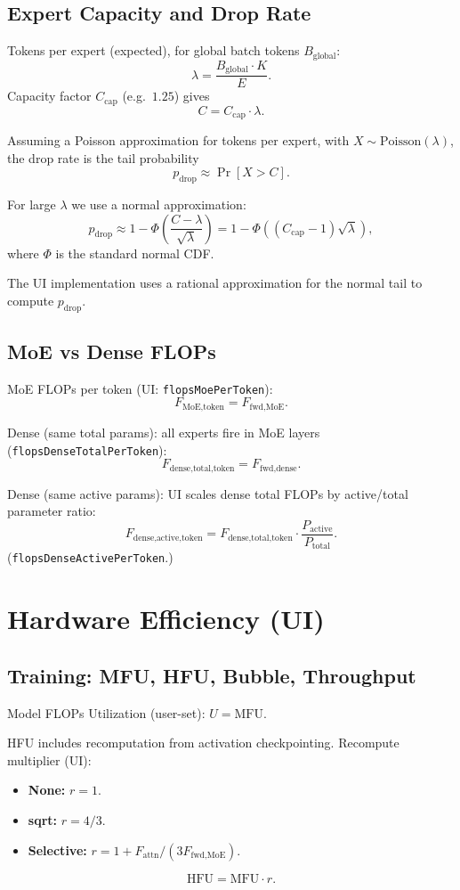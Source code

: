 \documentclass[11pt]{article}
\begin{document}
\subsection{Expert Capacity and Drop Rate}

Tokens per expert (expected), for global batch tokens $B_{\text{global}}$:
\[
\lambda = \frac{B_{\text{global}} \cdot K}{E}.
\]
Capacity factor $C_{\text{cap}}$ (e.g.\ $1.25$) gives
\[
C = C_{\text{cap}} \cdot \lambda.
\]

Assuming a Poisson approximation for tokens per expert,
with $X \sim \mathrm{Poisson}(\lambda)$, the drop rate is
the tail probability
\[
p_{\text{drop}} \approx \Pr[X > C].
\]

For large $\lambda$ we use a normal approximation:
\[
p_{\text{drop}} \approx
1 - \Phi\!\left(\frac{C - \lambda}{\sqrt{\lambda}}\right)
= 1 - \Phi\!\left((C_{\text{cap}} - 1)\sqrt{\lambda}\right),
\]
where $\Phi$ is the standard normal CDF.

The UI implementation uses a rational approximation for the
normal tail to compute $p_{\text{drop}}$.

\subsection{MoE vs Dense FLOPs}

MoE FLOPs per token (UI: \texttt{flopsMoePerToken}):
\[
F_{\text{MoE,token}} = F_{\text{fwd,MoE}}.
\]

Dense (same total params): all experts fire in MoE layers (\texttt{flopsDenseTotalPerToken}):
\[
F_{\text{dense,total,token}} = F_{\text{fwd,dense}}.
\]

Dense (same active params): UI scales dense total FLOPs by active/total parameter ratio:
\[
F_{\text{dense,active,token}} = F_{\text{dense,total,token}} \cdot \frac{P_{\text{active}}}{P_{\text{total}}}.
\]
(\texttt{flopsDenseActivePerToken}.)

\section{Hardware Efficiency (UI)}

\subsection{Training: MFU, HFU, Bubble, Throughput}

Model FLOPs Utilization (user-set): $U = \mathrm{MFU}$.

HFU includes recomputation from activation checkpointing. Recompute multiplier (UI):
\begin{itemize}
  \item \textbf{None:} $r = 1$.
  \item \textbf{sqrt:} $r = 4/3$.
  \item \textbf{Selective:} $r = 1 + F_{\text{attn}} / (3 F_{\text{fwd,MoE}})$.
\end{itemize}
\[
\mathrm{HFU} = \mathrm{MFU} \cdot r.
\]
\end{document}
